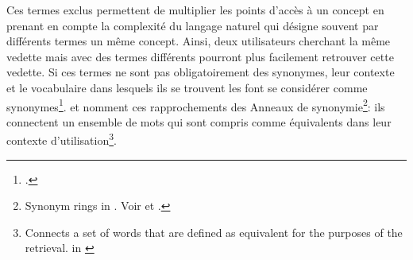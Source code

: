 


 Ces termes exclus permettent de multiplier les points d'accès à un concept en prenant en compte la complexité du langage naturel qui désigne souvent par différents termes un même concept. Ainsi, deux utilisateurs cherchant la même vedette mais avec des termes différents pourront plus facilement retrouver cette vedette. Si ces termes ne sont pas obligatoirement des synonymes, leur contexte et le vocabulaire dans lesquels ils se trouvent les font se considérer comme synonymes\footcite{rosenfeld_information_2015}.  et  nomment ces rapprochements des \og Anneaux de synonymie\fg{}\footnote{\og Synonym rings\fg{} in \cite{rosenfeld_information_2015}. Voir  et .}: ils connectent un ensemble de mots qui sont compris comme équivalents dans leur contexte d'utilisation\footnote{\og Connects a set of words that are defined as equivalent for the purposes of the retrieval.\fg{} in \cite{rosenfeld_information_2015}}.